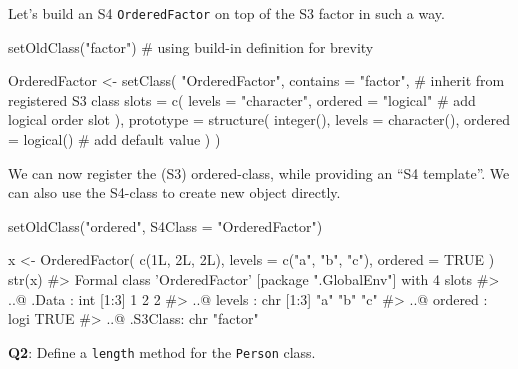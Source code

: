 \documentclass[
]{krantz}
\makeatletter
\newenvironment{Shaded}{\begin{snugshade}}{\end{snugshade}}
\newcommand{\CommentTok}[1]{\textcolor[rgb]{0.56,0.35,0.01}{\textit{#1}}}
\newcommand{\DataTypeTok}[1]{\textcolor[rgb]{0.13,0.29,0.53}{#1}}
\newcommand{\KeywordTok}[1]{\textcolor[rgb]{0.13,0.29,0.53}{\textbf{#1}}}
\newcommand{\NormalTok}[1]{#1}
\newcommand{\OtherTok}[1]{\textcolor[rgb]{0.56,0.35,0.01}{#1}}
\newcommand{\StringTok}[1]{\textcolor[rgb]{0.31,0.60,0.02}{#1}}
\newenvironment{kframe}{%
\medskip{}
\setlength{\fboxsep}{.8em}
 \def\at@end@of@kframe{}%
 \ifinner\ifhmode%
  \def\at@end@of@kframe{\end{minipage}}%
  \begin{minipage}{\columnwidth}%
 \fi\fi%
 \def\FrameCommand##1{\hskip\@totalleftmargin \hskip-\fboxsep
 \colorbox{shadecolor}{##1}\hskip-\fboxsep
     \hskip-\linewidth \hskip-\@totalleftmargin \hskip\columnwidth}%
 \MakeFramed {\advance\hsize-\width
   \@totalleftmargin\z@ \linewidth\hsize
   \@setminipage}}%
 {\par\unskip\endMakeFramed%
 \at@end@of@kframe}
\renewenvironment{Shaded}{\begin{kframe}}{\end{kframe}}
\renewcommand{\KeywordTok} [1]{\textcolor[rgb]{0.00,0.44,0.13}{{#1}}}
\renewcommand{\DataTypeTok}[1]{\textcolor[rgb]{0.56,0.13,0.00}{{#1}}}
\renewcommand{\StringTok}  [1]{\textcolor[rgb]{0.25,0.44,0.63}{{#1}}}
\renewcommand{\CommentTok} [1]{\textcolor[rgb]{0.38,0.63,0.69}{{#1}}}
\renewcommand{\OtherTok}   [1]{\textcolor[rgb]{0.00,0.44,0.13}{{#1}}}
\renewcommand{\NormalTok}  [1]{{#1}}
\makeatother
\begin{document}
Let's build an S4 \texttt{OrderedFactor} on top of the S3 factor in such a way.

\begin{Shaded}
\begin{Highlighting}[]
\KeywordTok{setOldClass}\NormalTok{(}\StringTok{"factor"}\NormalTok{)  }\CommentTok{# using build-in definition for brevity}

\NormalTok{OrderedFactor <-}\StringTok{ }\KeywordTok{setClass}\NormalTok{(}
  \StringTok{"OrderedFactor"}\NormalTok{,}
  \DataTypeTok{contains =} \StringTok{"factor"}\NormalTok{,  }\CommentTok{# inherit from registered S3 class}
  \DataTypeTok{slots =} \KeywordTok{c}\NormalTok{(}
    \DataTypeTok{levels =} \StringTok{"character"}\NormalTok{,}
    \DataTypeTok{ordered =} \StringTok{"logical"}  \CommentTok{# add logical order slot}
\NormalTok{  ),}
  \DataTypeTok{prototype =} \KeywordTok{structure}\NormalTok{(}
    \KeywordTok{integer}\NormalTok{(),}
    \DataTypeTok{levels =} \KeywordTok{character}\NormalTok{(),}
    \DataTypeTok{ordered =} \KeywordTok{logical}\NormalTok{()  }\CommentTok{# add default value}
\NormalTok{  )}
\NormalTok{)}
\end{Highlighting}
\end{Shaded}

We can now register the (S3) ordered-class, while providing an ``S4 template''. We can also use the S4-class to create new object directly.

\begin{Shaded}
\begin{Highlighting}[]
\KeywordTok{setOldClass}\NormalTok{(}\StringTok{"ordered"}\NormalTok{, }\DataTypeTok{S4Class =} \StringTok{"OrderedFactor"}\NormalTok{)}

\NormalTok{x <-}\StringTok{ }\KeywordTok{OrderedFactor}\NormalTok{(}
  \KeywordTok{c}\NormalTok{(1L, 2L, 2L),}
  \DataTypeTok{levels =} \KeywordTok{c}\NormalTok{(}\StringTok{"a"}\NormalTok{, }\StringTok{"b"}\NormalTok{, }\StringTok{"c"}\NormalTok{),}
  \DataTypeTok{ordered =} \OtherTok{TRUE}
\NormalTok{)}
\KeywordTok{str}\NormalTok{(x)}
\CommentTok{#> Formal class 'OrderedFactor' [package ".GlobalEnv"] with 4 slots}
\CommentTok{#>   ..@ .Data   : int [1:3] 1 2 2}
\CommentTok{#>   ..@ levels  : chr [1:3] "a" "b" "c"}
\CommentTok{#>   ..@ ordered : logi TRUE}
\CommentTok{#>   ..@ .S3Class: chr "factor"}
\end{Highlighting}
\end{Shaded}

\textbf{{Q2}}: Define a \texttt{length} method for the \texttt{Person} class.
\end{document}
